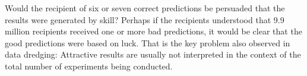 \documentclass[11pt]{article}
\begin{document}
Would the recipient of six or seven correct predictions be persuaded that the results were generated by skill? Perhaps if the recipients understood that 9.9 million recipients received one or more bad predictions, it would be clear that the good predictions were based on luck. That is the key problem also observed in data dredging: Attractive results are usually not interpreted in the context of the total number of experiments being conducted.
\end{document}
